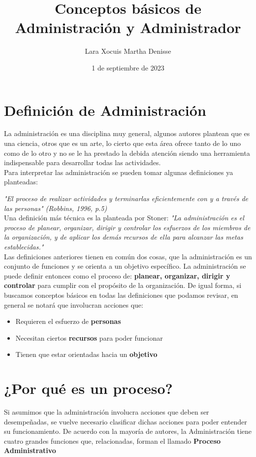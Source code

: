\documentclass[letterpaper,12pt]{article}
\title {\textbf{Conceptos básicos de Administración y Administrador}}
\author{Lara Xocuis Martha Denisse}
\date{1 de septiembre de 2023}
\begin{document}
\maketitle

\begin{sloppypar}
\section{Definición de Administración}
La administración es una disciplina muy general, algunos autores plantean que es una ciencia, otros que es un arte, lo cierto que esta área ofrece tanto de lo uno como de lo otro y no se le ha prestado la debida atención siendo una herramienta indispensable para desarrollar todas las actividades. 
\vspace{0.3cm}\\
Para interpretar las administración se pueden tomar algunas definiciones ya planteadas: 

\textit{"El proceso de realizar actividades y terminarlas eficientemente con y a través de las personas" (Robbins, 1996, p.5)}
\vspace{0.3cm}\\ 
Una definición más técnica es la planteada por Stoner: \textit{"La administración es el proceso de planear, organizar, dirigir y controlar los esfuerzos de los miembros de la organización, y de aplicar los demás recursos de ella para alcanzar las metas
establecidas."}
\vspace{0.3cm}\\ 
Las definiciones anteriores tienen en común dos cosas, que la administración es un conjunto de funciones y se orienta a un
objetivo específico. La administración se puede definir entonces como el proceso de: \textbf{planear, organizar, dirigir y controlar} para cumplir con el propósito de la organización. De igual forma, si buscamos conceptos básicos en todas las definiciones que podamos revisar, en general se notará que involucran acciones que: 
\begin{itemize}
    \item Requieren el esfuerzo de \textbf{personas}
    \item Necesitan ciertos \textbf{recursos} para poder funcionar 
    \item Tienen que estar orientadas hacia un \textbf{objetivo}
\end{itemize}

\section{¿Por qué es un proceso?}
Si asumimos que la administración involucra acciones que deben ser desempeñadas, se vuelve necesario clasificar dichas acciones para poder entender su funcionamiento. De acuerdo con la mayoría de autores, la Administración tiene cuatro grandes funciones que, relacionadas, forman el llamado \textbf{Proceso Administrativo}
\newpage

\end{sloppypar}
\end{document}
